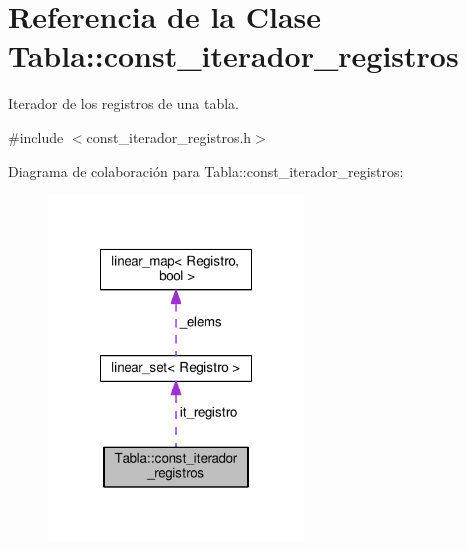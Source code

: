 \hypertarget{classTabla_1_1const__iterador__registros}{\section{Referencia de la Clase Tabla\-:\-:const\-\_\-iterador\-\_\-registros}
\label{classTabla_1_1const__iterador__registros}
}


Iterador de los registros de una tabla.  




{\ttfamily \#include $<$const\-\_\-iterador\-\_\-registros.\-h$>$}



Diagrama de colaboración para Tabla\-:\-:const\-\_\-iterador\-\_\-registros\-:
\nopagebreak
\begin{figure}[H]
\begin{center}
\leavevmode
\includegraphics[width=192pt]{classTabla_1_1const__iterador__registros__coll__graph}
\end{center}
\end{figure}

